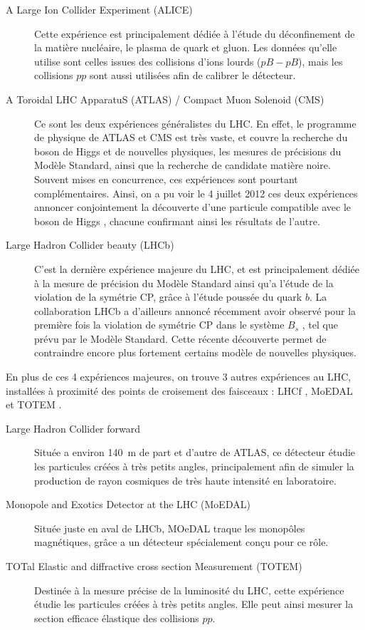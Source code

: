 \begin{description}
  \item[A Large Ion Collider Experiment (ALICE)] Cette expérience est principalement dédiée à l'étude du déconfinement de la matière nucléaire, le plasma de quark et gluon. Les données qu'elle utilise sont celles issues des collisions d'ions lourds ($pB-pB$), mais les collisions $pp$ sont aussi utilisées afin de calibrer le détecteur.
  \item[A Toroidal LHC ApparatuS (ATLAS) / Compact Muon Solenoid (CMS)] Ce sont les deux expériences généralistes du LHC. En effet, le programme de physique de ATLAS et CMS est très vaste, et couvre la recherche du boson de Higgs et de nouvelles physiques, les mesures de précisions du Modèle Standard, ainsi que la recherche de candidate matière noire. Souvent mises en concurrence, ces expériences sont pourtant complémentaires. Ainsi, on a pu voir le 4 juillet 2012 ces deux expériences annoncer conjointement la découverte d'une particule compatible avec le boson de Higgs \citep{higgs_atlas,higgs_cms}, chacune confirmant ainsi les résultats de l'autre.
  \item[Large Hadron Collider beauty (LHCb)] C'est la dernière expérience majeure du LHC, et est principalement dédiée à la mesure de précision du Modèle Standard ainsi qu'a l'étude de la violation de la symétrie CP, grâce à l'étude poussée du quark $b$. La collaboration LHCb a d'ailleurs annoncé récemment avoir observé pour la première fois la violation de symétrie CP dans le système $B_s$ \citep{lhcb_bs}, tel que prévu par le Modèle Standard. Cette récente découverte permet de contraindre encore plus fortement certains modèle de nouvelles physiques.
\end{description}

En plus de ces 4 expériences majeures, on trouve 3 autres expériences au LHC, installées à proximité des points de croisement des faisceaux : LHCf \citep{lhcf}, MoEDAL \citep{moedal} et TOTEM \citep{totem}.

\begin{description}
  \item[Large Hadron Collider forward] Située a environ \SI{140}{\m} de part et d'autre de ATLAS, ce détecteur étudie les particules créées à très petits angles, principalement afin de simuler la production de rayon cosmiques de très haute intensité en laboratoire.
  \item[Monopole and Exotics Detector at the LHC (MoEDAL)] Située juste en aval de LHCb, MOeDAL traque les monopôles magnétiques, grâce a un détecteur spécialement conçu pour ce rôle.
  \item[TOTal Elastic and diffractive cross section Measurement (TOTEM)] Destinée à la mesure précise de la luminosité du LHC, cette expérience étudie les particules créées à très petits angles. Elle peut ainsi mesurer la section efficace élastique des collisions $pp$.
\end{description}

